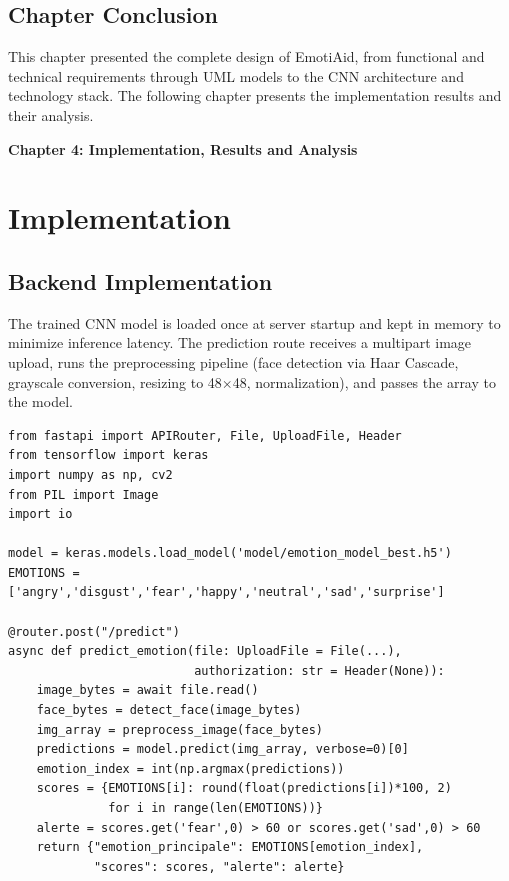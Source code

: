 \documentclass[a4paper,12pt,oneside]{report}
\begin{document}
\subsection*{Chapter Conclusion}

This chapter presented the complete design of EmotiAid, from functional and
technical requirements through UML models to the CNN architecture and technology
stack. The following chapter presents the implementation results and their analysis.

\clearpage

\newpage
\thispagestyle{fancy}
{\LARGE \bfseries \noindent Chapter 4: Implementation, Results and Analysis}
\vspace{2em}
\renewcommand{\thesection}{\Roman{section}}
\justifying

\section{Implementation}

\subsection{Backend Implementation}

The trained CNN model is loaded once at server startup and kept in memory to
minimize inference latency. The prediction route receives a multipart image
upload, runs the preprocessing pipeline (face detection via Haar Cascade,
grayscale conversion, resizing to 48$\times$48, normalization), and passes the
array to the model.

\begin{lstlisting}[caption={FastAPI Prediction Route (routes/predict.py)}]
from fastapi import APIRouter, File, UploadFile, Header
from tensorflow import keras
import numpy as np, cv2
from PIL import Image
import io

model = keras.models.load_model('model/emotion_model_best.h5')
EMOTIONS = ['angry','disgust','fear','happy','neutral','sad','surprise']

@router.post("/predict")
async def predict_emotion(file: UploadFile = File(...),
                          authorization: str = Header(None)):
    image_bytes = await file.read()
    face_bytes = detect_face(image_bytes)
    img_array = preprocess_image(face_bytes)
    predictions = model.predict(img_array, verbose=0)[0]
    emotion_index = int(np.argmax(predictions))
    scores = {EMOTIONS[i]: round(float(predictions[i])*100, 2)
              for i in range(len(EMOTIONS))}
    alerte = scores.get('fear',0) > 60 or scores.get('sad',0) > 60
    return {"emotion_principale": EMOTIONS[emotion_index],
            "scores": scores, "alerte": alerte}
\end{lstlisting}
\end{document}
